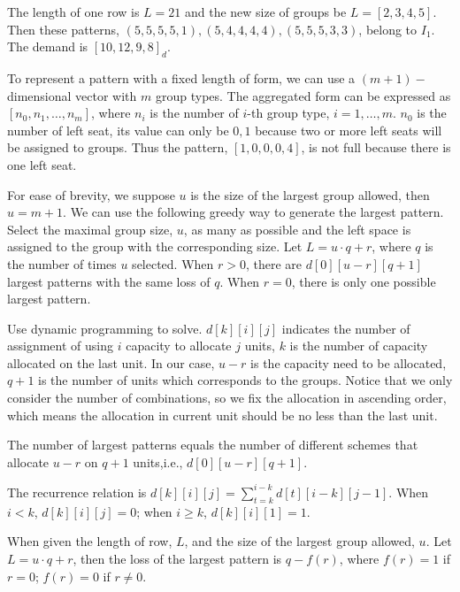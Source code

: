 \begin{example}
  The length of one row is $L = 21$ and the new size of groups be $L = [2, 3, 4, 5]$. Then these patterns, $(5, 5, 5, 5, 1),(5, 4, 4, 4, 4),(5, 5, 5, 3, 3)$, belong to $I_1$. The demand is $[10, 12, 9, 8]_d$.
\end{example}

To represent a pattern with a fixed length of form, we can use a $(m+1)-$dimensional vector with $m$ group types. The aggregated form can be expressed as $[n_0, n_1, \ldots, n_m]$, where $n_i$ is the number of $i$-th group type, $i=1,\ldots,m$. 
$n_0$ is the number of left seat, its value can only be $0, 1$ because two or more left seats will be assigned to groups. Thus the pattern, $[1, 0, 0, 0, 4]$, is not full because there is one left seat.

For ease of brevity, we suppose $u$ is the size of the largest group allowed, then $u =m+1$.
We can use the following greedy way to generate the largest pattern. Select the maximal group size, $u$, as many as possible and the left space is assigned to the group with the corresponding size. Let $L = u\cdot q + r$, where $q$ is the number of times $u$ selected. When $r>0$, there are $d[0][u-r][q+1]$ largest patterns with the same loss of $q$. When $r =0$, there is only one possible largest pattern.


Use dynamic programming to solve. $d[k][i][j]$ indicates the number of assignment of using $i$ capacity to allocate $j$ units, $k$ is the number of capacity allocated on the last unit. In our case, $u-r$ is the capacity need to be allocated, $q+1$ is the number of units which corresponds to the groups. Notice that we only consider the number of combinations, so we fix the allocation in ascending order, which means the allocation in current unit should be no less than the last unit.  

The number of largest patterns equals the number of different schemes that allocate $u-r$ on $q+1$ units,i.e., $d[0][u-r][q+1]$.

The recurrence relation is $d[k][i][j] = \sum_{t=k}^{i-k} d[t][i-k][j-1]$. 
When $i < k$, $d[k][i][j] =0$; when $i \geq k$, $d[k][i][1] =1$.

\begin{lem}
When given the length of row, $L$, and the size of the largest group allowed, $u$. Let $L = u\cdot q + r$, then the loss of the largest pattern is $q - f(r)$, where $f(r) =1$ if $r=0$; $f(r) =0$ if $r \neq 0$.
\end{lem}


